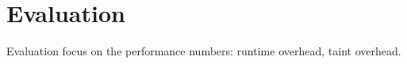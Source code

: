 \section{Evaluation}
\label{s:eval}

Evaluation focus on the performance numbers: runtime overhead, taint overhead.
